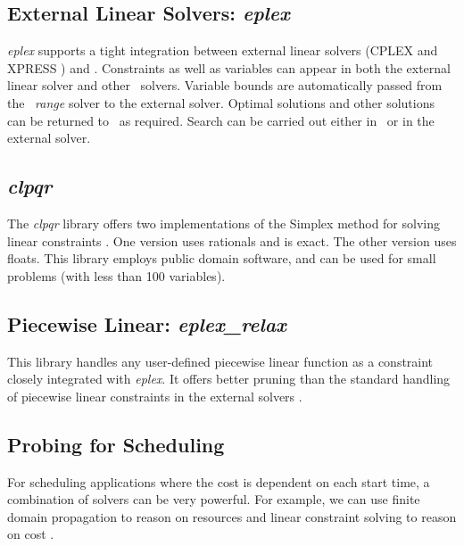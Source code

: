 \subsection{External Linear Solvers: {\em eplex}}
{\em eplex} supports a tight integration \cite{Bockmayr} between
external linear solvers (CPLEX \cite{ILOG} and XPRESS \cite{Dash})
and \eclipse. 
Constraints as well as variables can appear in both the external
linear solver and other \eclipse\  solvers.
Variable bounds are automatically passed from the \eclipse\  {\em range}
solver to the external solver.
Optimal solutions and other solutions can be returned to \eclipse\  as
required.
Search can be carried out either in \eclipse\  or in the external solver.

\subsection{{\em clpqr}}
The {\em clpqr} library offers two implementations of the Simplex
method for solving linear constraints \cite{Holzbauer}.  
One version uses rationals and
is exact.  The other version uses floats.
This library employs public domain software, and can be used for small
problems (with less than 100 variables).

\subsection{Piecewise Linear: {\em eplex\_relax}}
This library handles any user-defined piecewise linear function as a
constraint closely integrated with {\em eplex}.  It offers better
pruning than the standard handling of piecewise linear constraints
in the external solvers \cite{Ajili}.


\subsection{Probing for Scheduling}
For scheduling applications where the cost is dependent on each start
time, a combination of solvers can be very powerful.
For example, we can use finite domain
propagation to reason on 
resources and linear constraint solving to reason on cost \cite{HaniProbe}.
 
